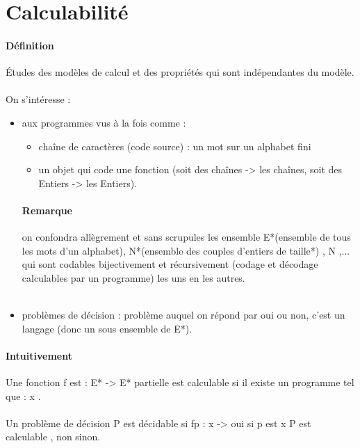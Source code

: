 \documentclass{report}
\begin{document}
\section{Calculabilité}
\paragraph{Définition} Études des modèles de calcul et des propriétés qui sont indépendantes du modèle.\\\\On s'intéresse : 
\begin{itemize}
\item aux programmes vus à la fois comme : 
\begin{itemize}
\item chaîne de caractères (code source) : un mot sur un alphabet fini
\item un objet qui code une fonction (soit des chaînes -> les chaînes, soit des Entiers -> les Entiers).
\end{itemize}
\paragraph{Remarque}on confondra allègrement et sans scrupules les ensemble E*(ensemble de tous les mots d'un alphabet), N*(ensemble des couples d'entiers de taille*) , N ,... qui sont codables bijectivement et récursivement (codage et décodage calculables par un programme)  les uns en les autres.\\\\
\item problèmes de décision : problème auquel on répond par oui ou non, c'est un langage (donc un sous ensemble de E*).
\end{itemize}
\paragraph{Intuitivement}
Une fonction f est : E* -> E* partielle est calculable si il existe un programme tel que : \forall x \in \sigma * .\\\\
Un problème de décision P \subset \sigma * est décidable si fp : x -> oui si p est x \in P est calculable , non sinon.
\end{document}
